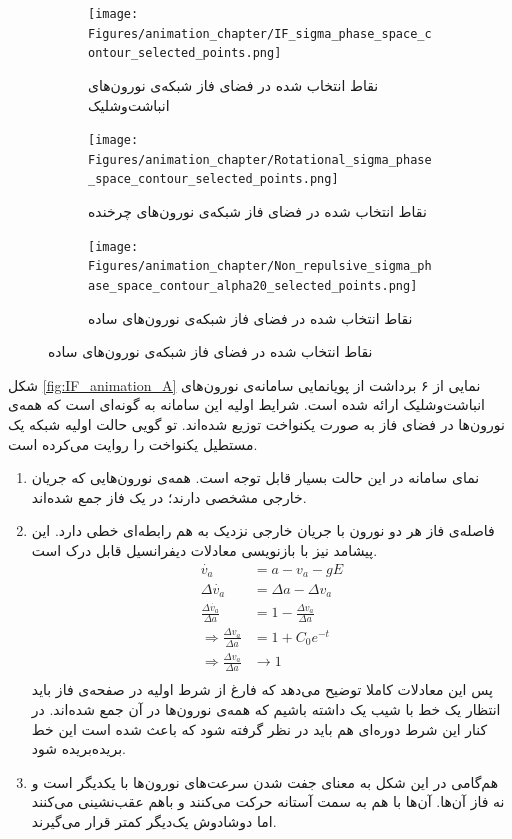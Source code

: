 \begin{figure}
	\begin{subfigure}{0.5\textwidth}
	\texttt{[image: Figures/animation\_chapter/IF\_sigma\_phase\_space\_contour\_selected\_points.png]}
	\caption{
		نقاط انتخاب شده در فضای فاز شبکه‌ی نورون‌های انباشت‌وشلیک
	}
	\label{fig:IF_abc}
	\end{subfigure}
	\hfill
	\begin{subfigure}{0.5\textwidth}
		\texttt{[image: Figures/animation\_chapter/Rotational\_sigma\_phase\_space\_contour\_selected\_points.png]}
		\caption{
		نقاط انتخاب شده در فضای فاز شبکه‌ی نورون‌های چرخنده
	}
		\label{fig:Rotational_abc}
	\end{subfigure}
	\hfill
	\begin{subfigure}{0.5\textwidth}
		\texttt{[image: Figures/animation\_chapter/Non\_repulsive\_sigma\_phase\_space\_contour\_alpha20\_selected\_points.png]}
		\caption{
		نقاط انتخاب شده در فضای فاز شبکه‌ی نورون‌های ساده
		}
		\label{fig:Non_repulsive_abc}
	\end{subfigure}
	\hfill
	\label{fig:abc_points_neuron_models}
\end{figure}


شکل
\ref{fig:IF_animation_A}
نمایی از ۶ برداشت از پویانمایی سامانه‌ی نورون‌های انباشت‌وشلیک ارائه شده است. شرایط اولیه این سامانه به گونه‌ای است که همه‌ی نورون‌ها در فضای فاز به صورت یکنواخت توزیع شده‌اند. تو گویی حالت اولیه شبکه یک مستطیل یکنواخت را روایت می‌کرده است.\\

\begin{enumerate}
	\item 
	نمای سامانه در این حالت بسیار قابل توجه است. همه‌ی نورون‌هایی که جریان خارجی مشخصی دارند؛ در یک فاز جمع شده‌اند.
	\item 
	 فاصله‌ی فاز هر دو نورون با جریان خارجی نزدیک به هم رابطه‌ای خطی دارد. این پیشامد نیز با بازنویسی معادلات دیفرانسیل قابل درک است.
	 \begin{align}
	 	\dot{v_a} &= a - v_a - g E\\
	 	\Delta\dot{v_a} &= \Delta a - \Delta v_a\\
	 	\frac{\Delta\dot{v_a}}{\Delta a} &= 1 - \frac{\Delta v_a}{\Delta a}\\
	 	\Rightarrow \frac{\Delta v_a}{\Delta a} &= 1 + C_0 e^{-t}\\
	 	\Rightarrow \frac{\Delta v_a}{\Delta a} &\rightarrow 1\\
	 \end{align}
 پس این معادلات کاملا توضیح می‌دهد که فارغ از شرط اولیه در صفحه‌ی فاز باید انتظار یک خط با شیب یک داشته باشیم که همه‌ی نورون‌ها در آن جمع شده‌اند. در کنار این شرط دوره‌ای هم باید در نظر گرفته شود که باعث شده است این خط بریده‌بریده شود.
 	\item 
 	هم‌گامی در این شکل به معنای جفت شدن سرعت‌های نورون‌ها با یکدیگر است و نه فاز آن‌ها. آن‌ها با هم به سمت آستانه حرکت می‌کنند و باهم عقب‌نشینی می‌کنند اما دوشادوش یک‌دیگر کمتر قرار می‌گیرند.
\end{enumerate}



